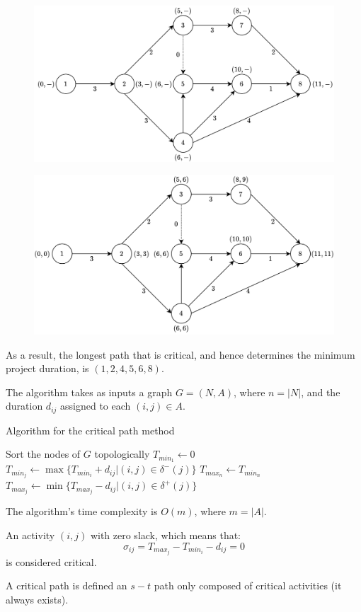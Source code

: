 \begin{example}
    \begin{figure}[H]
        \centering
        \includegraphics[width=0.6\linewidth]{images/aproject.png}
    \end{figure}
    \begin{figure}[H]
        \centering
        \includegraphics[width=0.6\linewidth]{images/aproject1.png}
    \end{figure}
    As a result, the longest path that is critical, and hence determines the minimum project duration, is $(1,2,4,5,6,8)$.
\end{example}

The algorithm takes as inputs a graph $G = (N,A)$, where $n= \left\lvert N \right\rvert $, and the duration $d_{ij}$ assigned to each $(i,j) \in A$. 
\begin{algorithm}[H]
    \caption{Algorithm for the critical path method}
        \begin{algorithmic}[1]
            \State Sort the nodes of $G$ topologically
            \State $T_{min_1} \leftarrow 0$
                \State $T_{min_j} \leftarrow \max\{T_{min_i}+d_{ij}|(i,j) \in \delta^{-}(j)\}$
            \EndFor
            \State $T_{max_n} \leftarrow T_{min_n}$
            \State $T_{max_j} \leftarrow \min\{T_{max_j}-d_{ij}|(i,j) \in \delta^{+}(j)\}$
            \EndFor
        \end{algorithmic}
\end{algorithm}
The algorithm's time complexity is $O(m)$, where $m =\left\lvert A\right\rvert$. 
\begin{definition}
    An activity $(i,j)$ with zero slack, which means that:
    \[\sigma_{ij}=T_{max_j}-T_{min_i}-d_{ij}=0\]
    is considered critical. 
\end{definition}
\begin{definition}
    A critical path is defined an $s-t$ path only composed of critical activities (it always exists).
\end{definition}

